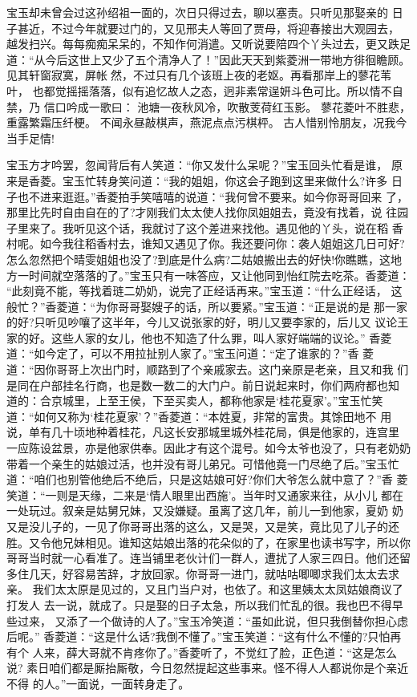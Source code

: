 宝玉却未曾会过这孙绍祖一面的，次日只得过去，聊以塞责。只听见那娶亲的
日子甚近，不过今年就要过门的，又见邢夫人等回了贾母，将迎春接出大观园去，
越发扫兴。每每痴痴呆呆的，不知作何消遣。又听说要陪四个丫头过去，更又跌足
道：“从今后这世上又少了五个清净人了！”因此天天到紫菱洲一带地方徘徊瞻顾。
见其轩窗寂寞，屏帐然，不过只有几个该班上夜的老妪。再看那岸上的蓼花苇叶，
也都觉摇摇落落，似有追忆故人之态，迥非素常逞妍斗色可比。所以情不自禁，乃
信口吟成一歌曰：
池塘一夜秋风冷，吹散芰荷红玉影。
蓼花菱叶不胜悲，重露繁霜压纤梗。
不闻永昼敲棋声，燕泥点点污棋枰。
古人惜别怜朋友，况我今当手足情!

宝玉方才吟罢，忽闻背后有人笑道：“你又发什么呆呢？”宝玉回头忙看是谁，
原来是香菱。宝玉忙转身笑问道：“我的姐姐，你这会子跑到这里来做什么?许多
日子也不进来逛逛。”香菱拍手笑嘻嘻的说道：“我何曾不要来。如今你哥哥回来
了，那里比先时自由自在的了?才刚我们太太使人找你凤姐姐去，竟没有找着，说
往园子里来了。我听见这个话，我就讨了这个差进来找他。遇见他的丫头，说在稻
香村呢。如今我往稻香村去，谁知又遇见了你。我还要问你：袭人姐姐这几日可好?
怎么忽然把个晴雯姐姐也没了?到底是什么病?二姑娘搬出去的好快!你瞧瞧，这地
方一时间就空落落的了。”宝玉只有一味答应，又让他同到怡红院去吃茶。香菱道：
“此刻竟不能，等找着琏二奶奶，说完了正经话再来。”宝玉道：“什么正经话，
这般忙？”香菱道：“为你哥哥娶嫂子的话，所以要紧。”宝玉道：“正是说的是
那一家的好?只听见吵嚷了这半年，今儿又说张家的好，明儿又要李家的，后儿又
议论王家的好。这些人家的女儿，他也不知造了什么罪，叫人家好端端的议论。”
香菱道：“如今定了，可以不用拉扯别人家了。”宝玉问道：“定了谁家的？”香
菱道：“因你哥哥上次出门时，顺路到了个亲戚家去。这门亲原是老亲，且又和我
们是同在户部挂名行商，也是数一数二的大门户。前日说起来时，你们两府都也知
道的：合京城里，上至王侯，下至买卖人，都称他家是‘桂花夏家’。”宝玉忙笑
道：“如何又称为‘桂花夏家’？”香菱道：“本姓夏，非常的富贵。其馀田地不
用说，单有几十顷地种着桂花，凡这长安那城里城外桂花局，俱是他家的，连宫里
一应陈设盆景，亦是他家供奉。因此才有这个混号。如今太爷也没了，只有老奶奶
带着一个亲生的姑娘过活，也并没有哥儿弟兄。可惜他竟一门尽绝了后。”宝玉忙
道：“咱们也别管他绝后不绝后，只是这姑娘可好?你们大爷怎么就中意了？”香
菱笑道：“一则是天缘，二来是‘情人眼里出西施’。当年时又通家来往，从小儿
都在一处玩过。叙亲是姑舅兄妹，又没嫌疑。虽离了这几年，前儿一到他家，夏奶
奶又是没儿子的，一见了你哥哥出落的这么，又是哭，又是笑，竟比见了儿子的还
胜。又令他兄妹相见。谁知这姑娘出落的花朵似的了，在家里也读书写字，所以你
哥哥当时就一心看准了。连当铺里老伙计们一群人，遭扰了人家三四日。他们还留
多住几天，好容易苦辞，才放回家。你哥哥一进门，就咕咕唧唧求我们太太去求亲。
我们太太原是见过的，又且门当户对，也依了。和这里姨太太凤姑娘商议了打发人
去一说，就成了。只是娶的日子太急，所以我们忙乱的很。我也巴不得早些过来，
又添了一个做诗的人了。”宝玉冷笑道：“虽如此说，但只我倒替你担心虑后呢。”
香菱道：“这是什么话?我倒不懂了。”宝玉笑道：“这有什么不懂的?只怕再有个
人来，薛大哥就不肯疼你了。”香菱听了，不觉红了脸，正色道：“这是怎么说?
素日咱们都是厮抬厮敬，今日忽然提起这些事来。怪不得人人都说你是个亲近不得
的人。”一面说，一面转身走了。


